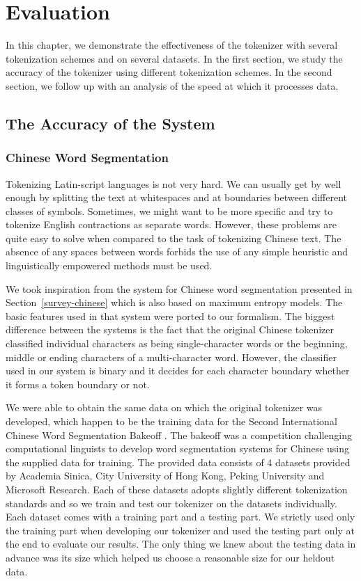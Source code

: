 \chapter{Evaluation}
\label{chap:eval}

In this chapter, we demonstrate the effectiveness of the tokenizer with several
tokenization schemes and on several datasets. In the first section, we study
the accuracy of the tokenizer using different tokenization schemes. In the
second section, we follow up with an analysis of the speed at which it
processes data.

\section{The Accuracy of the System}
\label{sec:eval-acc}

\subsection{Chinese Word Segmentation}
\label{ssec:eval-acc-chinese}

Tokenizing Latin-script languages is not very hard. We can usually get by well
enough by splitting the text at whitespaces and at boundaries between different
classes of symbols. Sometimes, we might want to be more specific and try to
tokenize English contractions as separate words. However, these problems are
quite easy to solve when compared to the task of tokenizing Chinese text. The
absence of any spaces between words forbids the use of any simple heuristic and
linguistically empowered methods must be used.

We took inspiration from the system for Chinese word segmentation presented in
Section~\ref{survey-chinese} \cite{seg-chinese-maxent} which is also based on
maximum entropy models. The basic features used in that system were ported to
our formalism. The biggest difference between the systems is the fact that the
original Chinese tokenizer classified individual characters as being
single-character words or the beginning, middle or ending characters of a
multi-character word. However, the classifier used in our system is binary and
it decides for each character boundary whether it forms a token boundary or
not.

We were able to obtain the same data on which the original tokenizer was
developed, which happen to be the training data for the Second International
Chinese Word Segmentation Bakeoff \cite{web-bakeoff}. The bakeoff was a
competition challenging computational linguists to develop word segmentation
systems for Chinese using the supplied data for training. The provided data
consists of 4 datasets provided by Academia Sinica, City University of Hong
Kong, Peking University and Microsoft Research. Each of these datasets adopts
slightly different tokenization standards and so we train and test our
tokenizer on the datasets individually. Each dataset comes with a training part
and a testing part. We strictly used only the training part when developing our
tokenizer and used the testing part only at the end to evaluate our results.
The only thing we knew about the testing data in advance was its size which
helped us choose a reasonable size for our heldout data.

